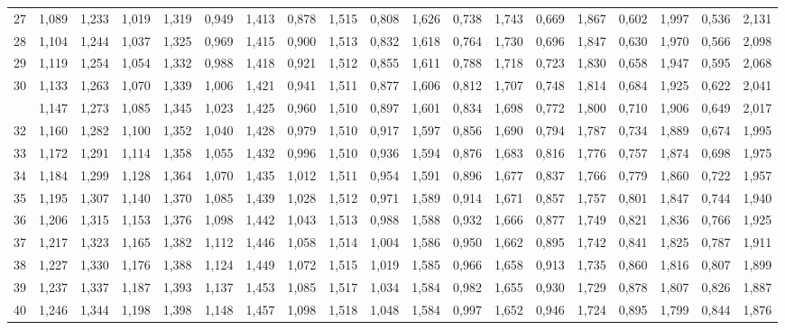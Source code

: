 \documentclass[12pt,a4paper]{article}
\begin{document}
{\begin{longtable}{@{\extracolsep{\fill}}rcccccccccccccccccc@{}}
27 & 1,089 & 1,233 & 1,019 & 1,319 & 0,949 & 1,413 & 0,878 & 1,515 & 0,808 & 1,626 & 0,738 & 1,743 & 0,669 & 1,867 & 0,602 & 1,997 & 0,536 & 2,131 \\
28 & 1,104 & 1,244 & 1,037 & 1,325 & 0,969 & 1,415 & 0,900 & 1,513 & 0,832 & 1,618 & 0,764 & 1,730 & 0,696 & 1,847 & 0,630 & 1,970 & 0,566 & 2,098 \\
29 & 1,119 & 1,254 & 1,054 & 1,332 & 0,988 & 1,418 & 0,921 & 1,512 & 0,855 & 1,611 & 0,788 & 1,718 & 0,723 & 1,830 & 0,658 & 1,947 & 0,595 & 2,068 \\
30 & 1,133 & 1,263 & 1,070 & 1,339 & 1,006 & 1,421 & 0,941 & 1,511 & 0,877 & 1,606 & 0,812 & 1,707 & 0,748 & 1,814 & 0,684 & 1,925 & 0,622 & 2,041 \\
\addlinespace[2pt]
31 & 1,147 & 1,273 & 1,085 & 1,345 & 1,023 & 1,425 & 0,960 & 1,510 & 0,897 & 1,601 & 0,834 & 1,698 & 0,772 & 1,800 & 0,710 & 1,906 & 0,649 & 2,017 \\
32 & 1,160 & 1,282 & 1,100 & 1,352 & 1,040 & 1,428 & 0,979 & 1,510 & 0,917 & 1,597 & 0,856 & 1,690 & 0,794 & 1,787 & 0,734 & 1,889 & 0,674 & 1,995 \\
33 & 1,172 & 1,291 & 1,114 & 1,358 & 1,055 & 1,432 & 0,996 & 1,510 & 0,936 & 1,594 & 0,876 & 1,683 & 0,816 & 1,776 & 0,757 & 1,874 & 0,698 & 1,975 \\
34 & 1,184 & 1,299 & 1,128 & 1,364 & 1,070 & 1,435 & 1,012 & 1,511 & 0,954 & 1,591 & 0,896 & 1,677 & 0,837 & 1,766 & 0,779 & 1,860 & 0,722 & 1,957 \\
35 & 1,195 & 1,307 & 1,140 & 1,370 & 1,085 & 1,439 & 1,028 & 1,512 & 0,971 & 1,589 & 0,914 & 1,671 & 0,857 & 1,757 & 0,801 & 1,847 & 0,744 & 1,940 \\
36 & 1,206 & 1,315 & 1,153 & 1,376 & 1,098 & 1,442 & 1,043 & 1,513 & 0,988 & 1,588 & 0,932 & 1,666 & 0,877 & 1,749 & 0,821 & 1,836 & 0,766 & 1,925 \\
37 & 1,217 & 1,323 & 1,165 & 1,382 & 1,112 & 1,446 & 1,058 & 1,514 & 1,004 & 1,586 & 0,950 & 1,662 & 0,895 & 1,742 & 0,841 & 1,825 & 0,787 & 1,911 \\
38 & 1,227 & 1,330 & 1,176 & 1,388 & 1,124 & 1,449 & 1,072 & 1,515 & 1,019 & 1,585 & 0,966 & 1,658 & 0,913 & 1,735 & 0,860 & 1,816 & 0,807 & 1,899 \\
39 & 1,237 & 1,337 & 1,187 & 1,393 & 1,137 & 1,453 & 1,085 & 1,517 & 1,034 & 1,584 & 0,982 & 1,655 & 0,930 & 1,729 & 0,878 & 1,807 & 0,826 & 1,887 \\
40 & 1,246 & 1,344 & 1,198 & 1,398 & 1,148 & 1,457 & 1,098 & 1,518 & 1,048 & 1,584 & 0,997 & 1,652 & 0,946 & 1,724 & 0,895 & 1,799 & 0,844 & 1,876 \\

\end{longtable}}
\end{document}
